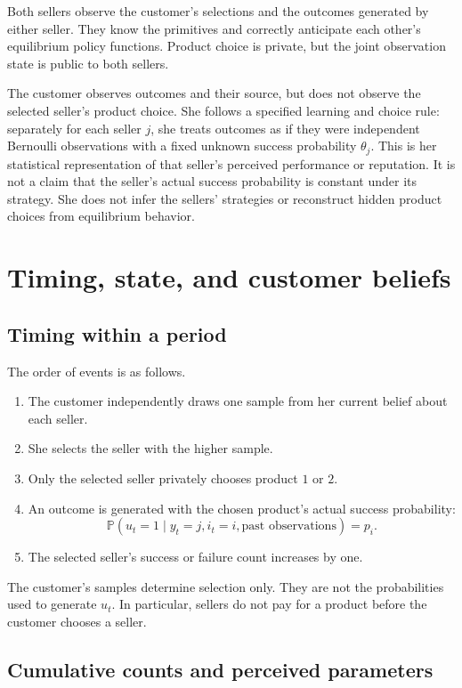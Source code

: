 \documentclass[11pt]{article}
\newcommand{\Pb}{\mathbb P}
\begin{document}
Both sellers observe the customer's selections and the outcomes generated
by either seller. They know the primitives and correctly anticipate each
other's equilibrium policy functions. Product choice is private, but the
joint observation state is public to both sellers.

The customer observes outcomes and their source, but does not observe the
selected seller's product choice. She follows a specified learning and
choice rule: separately for each seller $j$, she treats outcomes as if
they were independent Bernoulli observations with a fixed unknown success
probability $\theta_j$. This is her statistical representation of that
seller's perceived performance or reputation. It is not a claim that the
seller's actual success probability is constant under its strategy.
She does not infer the sellers' strategies or reconstruct hidden product
choices from equilibrium behavior.

\section{Timing, state, and customer beliefs}

\subsection{Timing within a period}

The order of events is as follows.
\begin{enumerate}
\item The customer independently draws one sample from her current belief
about each seller.
\item She selects the seller with the higher sample.
\item Only the selected seller privately chooses product $1$ or $2$.
\item An outcome is generated with the chosen product's actual success
probability:
\begin{equation}\label{eq:actual-outcome}
\Pb(u_t=1\mid y_t=j,i_t=i,\text{past observations})=p_i.
\end{equation}
\item The selected seller's success or failure count increases by one.
\end{enumerate}
The customer's samples determine selection only. They are not the
probabilities used to generate $u_t$. In particular, sellers do not pay
for a product before the customer chooses a seller.

\subsection{Cumulative counts and perceived parameters}
\end{document}
